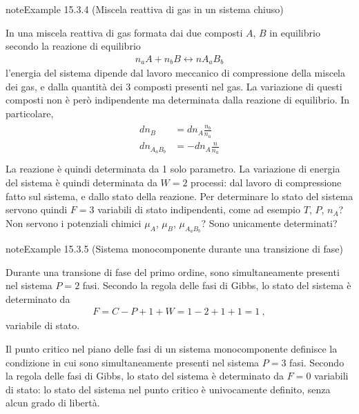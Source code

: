 \documentclass[letterpaper,10pt,italian]{jupyterBook}
\begin{document}
\label{ch/thermodynamics/principles-gibbs-phase-rule:example-7}
\begin{sphinxadmonition}{note}{Example 15.3.4 (Miscela reattiva di gas in un sistema chiuso)}



\sphinxAtStartPar
In una miscela reattiva di gas formata dai due composti \(A\), \(B\) in equilibrio secondo la reazione di equilibrio
\begin{equation*}
\begin{split}n_a A + n_b B \leftrightarrow n A_a B_b\end{split}
\end{equation*}
\sphinxAtStartPar
l’energia del sistema dipende dal lavoro meccanico di compressione della miscela dei gas, e dalla quantità dei 3 composti presenti nel gas. La variazione di questi composti non è però indipendente ma determinata dalla reazione di equilibrio. In particolare,
\begin{equation*}
\begin{split}\begin{aligned}
  d n_{B} & = d n_{A} \frac{n_b}{n_a} \\
  d n_{A_a B_b} & = - d n_{A} \frac{n}{n_a} \\
\end{aligned}\end{split}
\end{equation*}
\sphinxAtStartPar
La reazione è quindi determinata da 1 solo parametro. La variazione di energia del sistema è quindi determinata da \(W=2\) processi: dal lavoro di compressione fatto sul sistema, e dallo stato della reazione. Per determinare lo stato del sistema servono quindi \(F=3\) variabili di stato indipendenti, come ad esempio  \(T\), \(P\), \(n_A\)? Non servono i potenziali chimici \(\mu_A\), \(\mu_B\), \(\mu_{A_a B_b}\)? Sono unicamente determinati?
\end{sphinxadmonition}
\label{ch/thermodynamics/principles-gibbs-phase-rule:example-8}
\begin{sphinxadmonition}{note}{Example 15.3.5 (Sistema monocomponente durante una transizione di fase)}



\sphinxAtStartPar
{} Durante una transione di fase del primo ordine, sono simultaneamente presenti nel sistema \(P = 2\) fasi. Secondo la regola delle fasi di Gibbs, lo stato del sistema è determinato da
\begin{equation*}
\begin{split}F = C - P + 1 + W = 1 - 2 + 1 + 1 = 1 \ ,\end{split}
\end{equation*}
\sphinxAtStartPar
variabile di stato.

\sphinxAtStartPar
{} Il punto critico nel piano delle fasi di un sistema mono\sphinxhyphen{}componente definisce la condizione in cui sono simultaneamente presenti nel sistema \(P = 3\) fasi. Secondo la regola delle fasi di Gibbs, lo stato del sistema è determinato da \(F = 0\) variabili di stato: lo stato del sistema nel punto critico è univocamente definito, senza alcun grado di libertà.
\end{sphinxadmonition}
\end{document}
